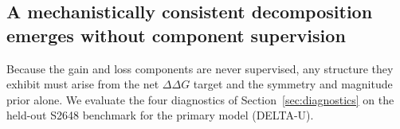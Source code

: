 \documentclass[11pt,a4paper]{article}
\theoremstyle{plain}
\theoremstyle{definition}
\begin{document}
\begin{table}[t]
\centering
\caption{Spearman correlation ($\rho$) on protein stability benchmarks. Published baseline results are taken from the original studies.}
\label{tab:main}
\end{table}

\subsection{A mechanistically consistent decomposition emerges without
component supervision}
Because the gain and loss components are never supervised, any structure they exhibit must arise from the net $\Delta\Delta G$ target and the symmetry and magnitude prior alone. We evaluate the four diagnostics of Section~\ref{sec:diagnostics} on the held-out S2648 benchmark for the primary model (DELTA-U).
\end{document}
